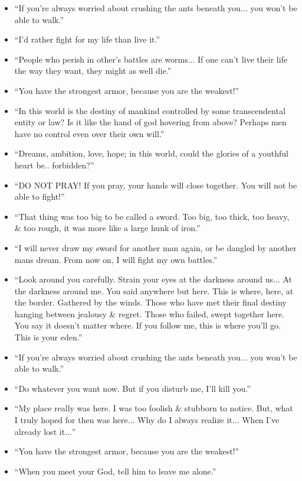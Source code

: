 \documentclass{article}
\begin{document}
\begin{enumerate}
\begin{itemize}
    	\item ``If you're always worried about crushing the ants beneath you$\ldots$ you won't be able to walk.''
    	\item ``I'd rather fight for my life than live it.''
    	\item ``People who perish in other's battles are worms$\ldots$ If one can't live their life the way they want, they might as well die.''
    	\item ``You have the strongest armor, because you are the weakest!''
    	\item ``In this world is the destiny of mankind controlled by some transcendental entity or law? Is it like the hand of god hovering from above? Perhaps men have no control even over their own will.''
    	\item ``Dreams, ambition, love, hope; in this world, could the glories of a youthful heart be.. forbidden?''
    	\item ``DO NOT PRAY! If you pray, your hands will close together. You will not be able to fight!''
    	\item ``That thing was too big to be called a sword. Too big, too thick, too heavy, \& too rough, it was more like a large hunk of iron.'' 
    	\item ``I will never draw my sword for another man again, or be dangled by another mans dream. From now on, I will fight my own battles.''
    	\item ``Look around you carefully. Strain your eyes at the darkness around us$\ldots$ At the darkness around me. You said anywhere but here. This is where, here, at the border. Gathered by the winds. Those who have met their final destiny hanging between jealousy \& regret. Those who failed, swept together here. You say it doesn't matter where. If you follow me, this is where you'll go. This is your eden.''
    	\item ``If you're always worried about crushing the ants beneath you$\ldots$ you won't be able to walk.''
    	\item ``Do whatever you want now. But if you disturb me, I'll kill you.''
    	\item ``My place really was here. I was too foolish \& stubborn to notice. But, what I truly hoped for then was here$\ldots$ Why do I always realize it$\ldots$ When I've already lost it$\ldots$''
    	\item ``You have the strongest armor, because you are the weakest!''
    	\item ``When you meet your God, tell him to leave me alone.''

\end{itemize}
\end{enumerate}
\end{document}

